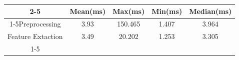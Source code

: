 \documentclass{standalone}
\begin{document}
 
 \begin{tabular}{|c |c |c |c |c |}
\cline{2-5}\cline{2-5} \multicolumn{1}{c |}{ } & Mean(ms) & Max(ms) & Min(ms) & Median(ms)\\ 
\cline{1-5}Preprocessing & 3.93 & 150.465 & 1.407 & 3.964\\ 
 \hhline{|=|=|=|=|=|}Feature Extaction & 3.49 & 20.202 & 1.253 & 3.305\\ 
 \cline{1-5}\hline \end{tabular}
 
\end{document}
